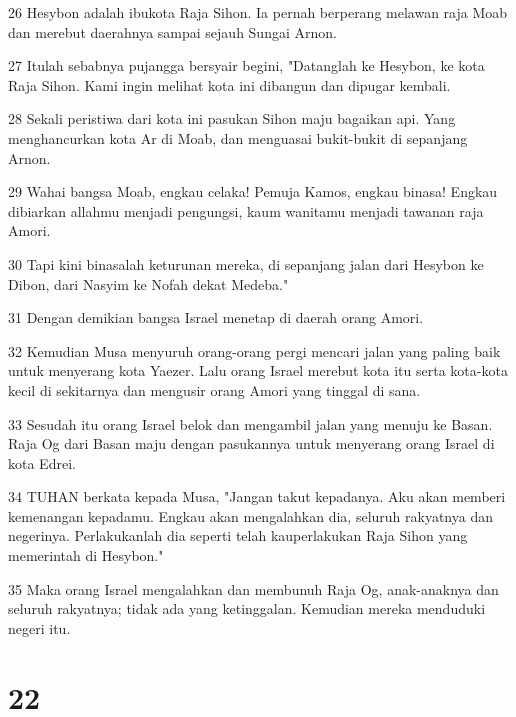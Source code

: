 \par 26 Hesybon adalah ibukota Raja Sihon. Ia pernah berperang melawan raja Moab dan merebut daerahnya sampai sejauh Sungai Arnon.
\par 27 Itulah sebabnya pujangga bersyair begini, "Datanglah ke Hesybon, ke kota Raja Sihon. Kami ingin melihat kota ini dibangun dan dipugar kembali.
\par 28 Sekali peristiwa dari kota ini pasukan Sihon maju bagaikan api. Yang menghancurkan kota Ar di Moab, dan menguasai bukit-bukit di sepanjang Arnon.
\par 29 Wahai bangsa Moab, engkau celaka! Pemuja Kamos, engkau binasa! Engkau dibiarkan allahmu menjadi pengungsi, kaum wanitamu menjadi tawanan raja Amori.
\par 30 Tapi kini binasalah keturunan mereka, di sepanjang jalan dari Hesybon ke Dibon, dari Nasyim ke Nofah dekat Medeba."
\par 31 Dengan demikian bangsa Israel menetap di daerah orang Amori.
\par 32 Kemudian Musa menyuruh orang-orang pergi mencari jalan yang paling baik untuk menyerang kota Yaezer. Lalu orang Israel merebut kota itu serta kota-kota kecil di sekitarnya dan mengusir orang Amori yang tinggal di sana.
\par 33 Sesudah itu orang Israel belok dan mengambil jalan yang menuju ke Basan. Raja Og dari Basan maju dengan pasukannya untuk menyerang orang Israel di kota Edrei.
\par 34 TUHAN berkata kepada Musa, "Jangan takut kepadanya. Aku akan memberi kemenangan kepadamu. Engkau akan mengalahkan dia, seluruh rakyatnya dan negerinya. Perlakukanlah dia seperti telah kauperlakukan Raja Sihon yang memerintah di Hesybon."
\par 35 Maka orang Israel mengalahkan dan membunuh Raja Og, anak-anaknya dan seluruh rakyatnya; tidak ada yang ketinggalan. Kemudian mereka menduduki negeri itu.

\chapter{22}

